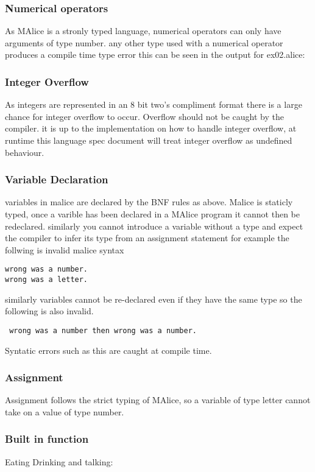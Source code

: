 \documentclass[a4wide, 10pt]{article}
\begin{document}
\subsubsection{Numerical operators}
As MAlice is a stronly typed language, numerical operators can only have 
arguments of type number. any other type used with a numerical operator produces
a compile time type error this can be seen in the output for ex02.alice:


\subsubsection{Integer Overflow}
As integers are represented in an 8 bit two's compliment format there is a 
large chance for integer overflow to occur. Overflow should not be caught by the
compiler. it is up to the implementation on how to handle integer overflow, at 
runtime this language spec document will treat integer overflow as undefined 
behaviour.


\subsubsection{Variable Declaration}
variables in malice are declared by the BNF rules as above.
Malice is staticly typed, once a varible has been declared in a MAlice program 
it cannot then be redeclared. similarly you cannot introduce a variable without 
a type and expect the compiler to infer its type from an assignment statement for
example the follwing is invalid malice syntax

\texttt{wrong was a number.\\wrong was a letter.}

similarly variables cannot be re-declared even if they have the same type so the
following is also invalid.

\texttt{ wrong was a number then wrong was a number.}

Syntatic errors such as this are caught at compile time.


\subsubsection{Assignment}
Assignment follows the strict typing of MAlice, so a variable of type letter 
cannot take on a value of type number.


\subsubsection{Built in function}
Eating Drinking and talking: 
\end{document}
